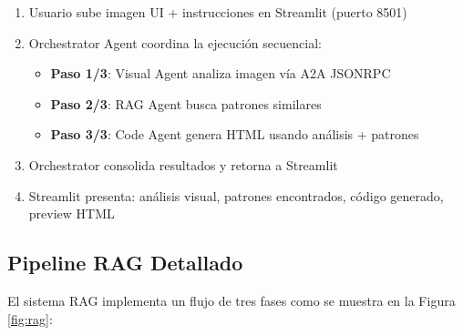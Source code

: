 \documentclass[12pt,a4paper]{article}
\begin{document}
\begin{enumerate}
    \item Usuario sube imagen UI + instrucciones en Streamlit (puerto 8501)
    \item Orchestrator Agent coordina la ejecución secuencial:
    \begin{itemize}
        \item \textbf{Paso 1/3}: Visual Agent analiza imagen vía A2A JSONRPC
        \item \textbf{Paso 2/3}: RAG Agent busca patrones similares
        \item \textbf{Paso 3/3}: Code Agent genera HTML usando análisis + patrones
    \end{itemize}
    \item Orchestrator consolida resultados y retorna a Streamlit
    \item Streamlit presenta: análisis visual, patrones encontrados, código generado, preview HTML
\end{enumerate}

\subsection{Pipeline RAG Detallado}

El sistema RAG implementa un flujo de tres fases como se muestra en la Figura \ref{fig:rag}:
\end{document}
